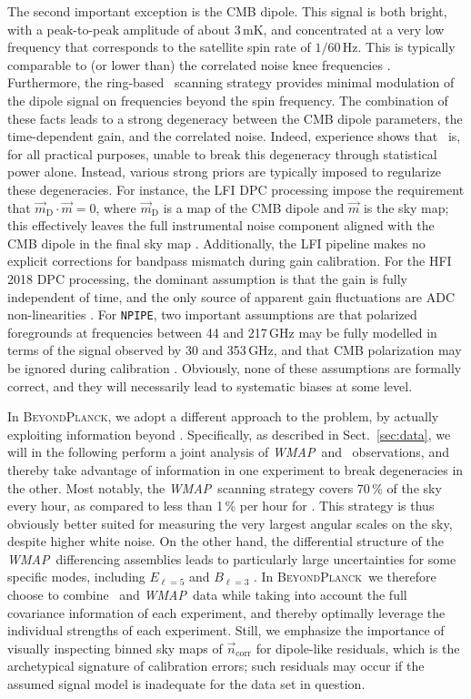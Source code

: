 \documentclass[onecolumn]{aa}
\def\WMAP{\emph{WMAP}}
\newcommand{\n}[0]{\vec{n}}
\newcommand{\m}[0]{\vec{m}}
\newcommand{\BP}{\textsc{BeyondPlanck}}
\newcommand{\npipe}[0]{\texttt{NPIPE}}
\begin{document}
The second important exception is the CMB dipole. This signal is both
bright, with a peak-to-peak amplitude of about 3\,mK, and concentrated
at a very low frequency that corresponds to the satellite spin rate of
$1/60\,$Hz. This is typically comparable to (or lower than) the
correlated noise knee frequencies \citep{planck2016-l02}. Furthermore,
the ring-based \Planck\ scanning strategy provides minimal modulation
of the dipole signal on frequencies beyond the spin frequency. The
combination of these facts leads to a strong degeneracy between the
CMB dipole parameters, the time-dependent gain, and the correlated
noise. Indeed, experience shows that \Planck\ is, for all practical
purposes, unable to break this degeneracy through statistical power
alone. Instead, various strong priors are typically imposed to
regularize these degeneracies. For instance, the LFI DPC processing
impose the requirement that $\m_{\mathrm{D}}\cdot\m=0$, where
$\m_{\mathrm{D}}$ is a map of the CMB dipole and $\m$ is the sky map;
this effectively leaves the full instrumental noise component aligned
with the CMB dipole in the final sky map
\citep{planck2014-a06}. Additionally, the LFI pipeline makes no
explicit corrections for bandpass mismatch during gain
calibration. For the HFI 2018 DPC processing, the dominant assumption
is that the gain is fully independent of time, and the only source of
apparent gain fluctuations are ADC non-linearities
\citep{planck2016-l03}. For \npipe, two important assumptions are that
polarized foregrounds at frequencies between 44 and 217\,GHz may be
fully modelled in terms of the signal observed by 30 and 353\,GHz, and
that CMB polarization may be ignored during calibration
\citep{planck2020-LVII}. Obviously, none of these assumptions are formally
correct, and they will necessarily lead to systematic biases at some
level.

In \BP, we adopt a different approach to the problem, by actually
exploiting information beyond \Planck. Specifically, as described in
Sect.~\ref{sec:data}, we will in the following perform a joint
analysis of \WMAP\ and \Planck\ observations, and thereby take
advantage of information in one experiment to break degeneracies in
the other. Most notably, the \WMAP\ scanning strategy covers 70\,\% of
the sky every hour, as compared to less than 1\,\% per hour for
\Planck. This strategy is thus obviously better suited for measuring
the very largest angular scales on the sky, despite higher white
noise. On the other hand, the differential structure of the
\WMAP\ differencing assemblies leads to particularly large
uncertainties for some specific modes, including $E_{\ell=5}$ and
$B_{\ell=3}$ \citep{jarosik2010}. In \BP\ we therefore choose to
combine \Planck\ and \WMAP\ data while taking into account the full
covariance information of each experiment, and thereby optimally
leverage the individual strengths of each experiment. Still, we
emphasize the importance of visually inspecting binned sky maps of
$\n_{\mathrm{corr}}$ for dipole-like residuals, which is the
archetypical signature of calibration errors; such residuals may occur
if the assumed signal model is inadequate for the data set in
question.
\end{document}
